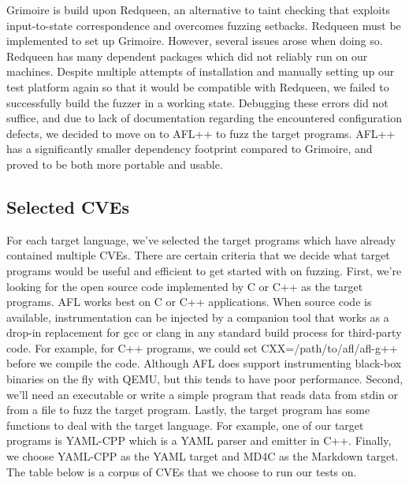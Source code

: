 \documentclass[12pt]{diazessay}
\begin{document}
Grimoire is build upon Redqueen, an alternative to taint checking that exploits input-to-state correspondence and overcomes fuzzing setbacks.
Redqueen must be implemented to set up Grimoire. However, several issues arose when doing so.
Redqueen has many dependent packages which did not reliably run on our machines.
Despite multiple attempts of installation and manually setting up our test platform again so that it would be compatible with Redqueen, we failed to successfully build the fuzzer in a working state.
Debugging these errors did not suffice, and due to lack of documentation regarding the encountered configuration defects, we decided to move on to AFL++ to fuzz the target programs.
AFL++ has a significantly smaller dependency footprint compared to Grimoire, and proved to be both more portable and usable. 


\subsection*{Selected CVEs}


For each target language, we’ve selected the target programs which have already contained multiple CVEs. There are certain criteria that we decide what target programs would be useful and efficient to get started with on fuzzing.  First, we’re looking for the open source code implemented by C or C++ as the target programs.  AFL works best on C or C++ applications. When source code is available, instrumentation can be injected by a companion tool that works as a drop-in replacement for gcc or clang in any standard build process for third-party code. For example, for C++ programs, we could set CXX=/path/to/afl/afl-g++ before we compile the code. Although AFL does support instrumenting black-box binaries on the fly with QEMU, but this tends to have poor performance. Second, we’ll need an executable or write a simple program that reads data from stdin or from a file to fuzz the target program. Lastly, the target program has some functions to deal with the target language. For example, one of our target programs is YAML-CPP which is a YAML parser and emitter in C++. Finally, we choose YAML-CPP as the YAML target and MD4C as the Markdown target.
The table below is a corpus of CVEs that we choose to run our tests on.
\end{document}
